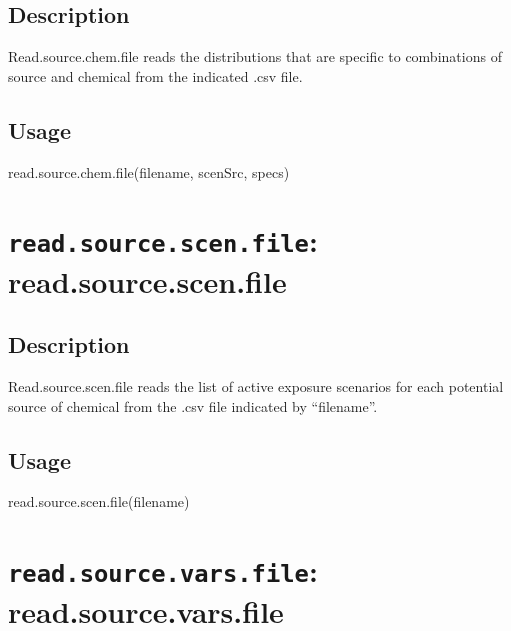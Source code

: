 \documentclass[
]{article}
\newenvironment{Shaded}{\begin{snugshade}}{\end{snugshade}}
\newcommand{\FunctionTok}[1]{\textcolor[rgb]{0.00,0.00,0.00}{#1}}
\newcommand{\NormalTok}[1]{#1}
\begin{document}
\hypertarget{description-44}{%
\subsection{Description}\label{description-44}}

Read.source.chem.file reads the distributions that are specific to
combinations of source and chemical from the indicated .csv file.

\hypertarget{usage-44}{%
\subsection{Usage}\label{usage-44}}

\begin{Shaded}
\begin{Highlighting}[]
\FunctionTok{read.source.chem.file}\NormalTok{(filename, scenSrc, specs)}
\end{Highlighting}
\end{Shaded}

\hypertarget{read.source.scen.file-read.source.scen.file}{%
\section{\texorpdfstring{\texttt{read.source.scen.file}:
read.source.scen.file}{read.source.scen.file: read.source.scen.file}}\label{read.source.scen.file-read.source.scen.file}}

\hypertarget{description-45}{%
\subsection{Description}\label{description-45}}

Read.source.scen.file reads the list of active exposure scenarios for
each potential source of chemical from the .csv file indicated by
``filename''.

\hypertarget{usage-45}{%
\subsection{Usage}\label{usage-45}}

\begin{Shaded}
\begin{Highlighting}[]
\FunctionTok{read.source.scen.file}\NormalTok{(filename)}
\end{Highlighting}
\end{Shaded}

\hypertarget{read.source.vars.file-read.source.vars.file}{%
\section{\texorpdfstring{\texttt{read.source.vars.file}:
read.source.vars.file}{read.source.vars.file: read.source.vars.file}}\label{read.source.vars.file-read.source.vars.file}}
\end{document}
